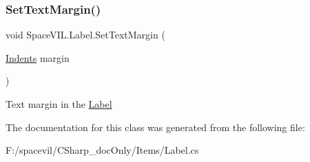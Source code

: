 \subsubsection{\texorpdfstring{Set\+Text\+Margin()}{SetTextMargin()}}
{\footnotesize\ttfamily void Space\+V\+I\+L.\+Label.\+Set\+Text\+Margin (\begin{DoxyParamCaption}\item[{\mbox{\hyperlink{struct_space_v_i_l_1_1_decorations_1_1_indents}{Indents}}}]{margin }\end{DoxyParamCaption})}



Text margin in the \mbox{\hyperlink{class_space_v_i_l_1_1_label}{Label}} 



The documentation for this class was generated from the following file\+:\begin{DoxyCompactItemize}
\item 
F\+:/spacevil/\+C\+Sharp\+\_\+doc\+Only/\+Items/Label.\+cs\end{DoxyCompactItemize}
